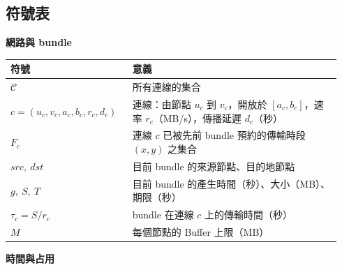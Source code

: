 
\renewcommand{\algorithmicrequire}{\textbf{輸入：}}
\renewcommand{\algorithmicensure}{\textbf{輸出：}}

\subsection*{符號表}

\noindent\textbf{網路與 bundle}

\noindent\begin{tabular}{p{0.34\linewidth}p{0.6\linewidth}}
\hline
符號 & 意義 \\
\hline
$\mathcal{C}$ & 所有連線的集合 \\
$c=(u_c, v_c, a_c, b_c, r_c, d_c)$ & 連線：由節點 $u_c$ 到 $v_c$，開放於 $[a_c,b_c]$，速率 $r_c$（MB/s），傳播延遲 $d_c$（秒） \\
$F_c$ & 連線 $c$ 已被先前 bundle 預約的傳輸時段 $(x,y)$ 之集合 \\
$\mathit{src},\ \mathit{dst}$ & 目前 bundle 的來源節點、目的地節點 \\
$g,\ S,\ T$ & 目前 bundle 的產生時間（秒）、大小（MB）、期限（秒） \\
$\tau_c = S / r_c$ & bundle 在連線 $c$ 上的傳輸時間（秒） \\
$M$ & 每個節點的 Buffer 上限（MB） \\
\hline
\end{tabular}

\medskip
\noindent\textbf{時間與占用}

